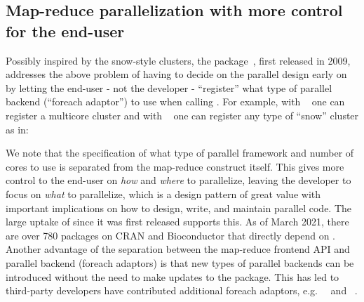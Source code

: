 \subsection{Map-reduce parallelization with more control for the end-user}
\label{map-reduce-parallelization-with-more-control-for-the-end-user}

Possibly inspired by the snow-style clusters, the 
package~\citep{CRAN:foreach,Kane_etal_2013}, first released in 2009,
addresses the above problem of having to decide on the parallel design
early on by letting the end-user - not the developer - ``register''
what type of parallel backend (``foreach adaptor'') to use when
calling . For example, with
~\citep{CRAN:doMC} one can register a multicore cluster and
with ~\citep{CRAN:doParallel} one can register any
type of ``snow'' cluster as in:
%
%
We note that the specification of what type of parallel framework and
number of cores to use is separated from the 
map-reduce construct itself. This gives more control to the end-user
on
\emph{how} and \emph{where} to parallelize, leaving the developer to
focus on \emph{what} to parallelize, which is a design pattern of
great value with important implications on how to design, write, and
maintain parallel code. The large uptake of  since it was
first released supports this. As of March 2021, there are over 780
packages on CRAN and Bioconductor that directly depend on
. Another advantage of the separation between the
map-reduce frontend API and parallel backend (foreach adaptors) is
that new types of parallel backends can be introduced without the need
to make updates to the  package. This has led to
third-party developers have contributed additional foreach adaptors,
e.g.\ ~\citep{CRAN:doMPI} and
~\citep{CRAN:doRedis}.

